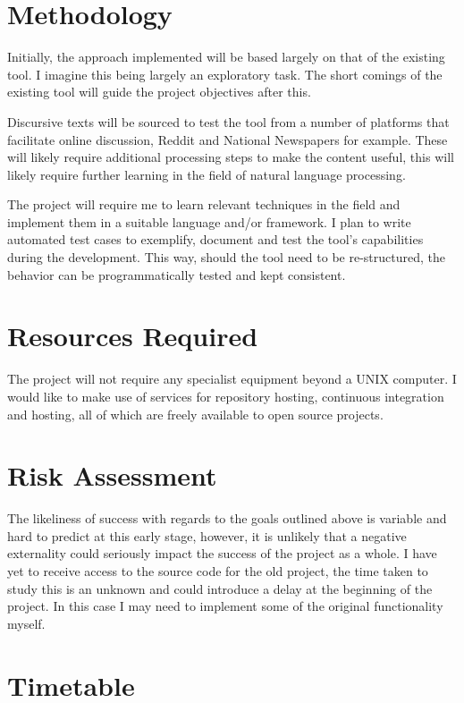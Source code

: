 \documentclass[tikz]{article}
\begin{document}
  \section{Methodology}
      Initially, the approach implemented will be based largely on that of the existing tool. I imagine this being largely an exploratory task. The short comings of the existing tool will guide the project objectives after this.

      Discursive texts will be sourced to test the tool from a number of platforms that facilitate online discussion, Reddit and National Newspapers for example. These will likely require additional processing steps to make the content useful, this will likely require further learning in the field of natural language processing.

      The project will require me to learn relevant techniques in the field and implement them in a suitable language and/or framework. I plan to write automated test cases to exemplify, document and test the tool's capabilities during the development. This way, should the tool need to be re-structured, the behavior can be programmatically tested and kept consistent.

  \section{Resources Required}
    The project will not require any specialist equipment beyond a UNIX computer. I would like to make use of services for repository hosting, continuous integration and hosting, all of which are freely available to open source projects.

  \section{Risk Assessment}
    The likeliness of success with regards to the goals outlined above is variable and hard to predict at this early stage, however, it is unlikely that a negative externality could seriously impact the success of the project as a whole. I have yet to receive access to the source code for the old project, the time taken to study this is an unknown and could introduce a delay at the beginning of the project. In this case I may need to implement some of the original functionality myself.

  \section{Timetable}
\end{document}

